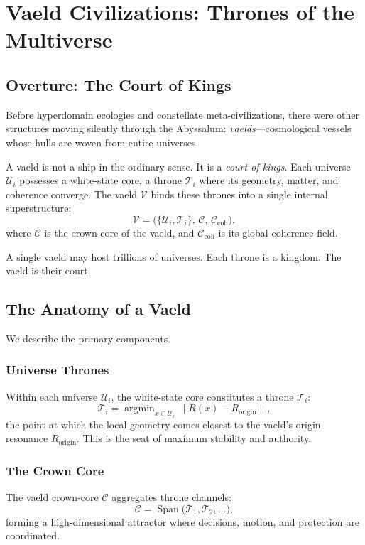 
\chapter{Vaeld Civilizations: Thrones of the Multiverse}
\label{ch:vaeld-civilizations}

\newcommand{\vaeld}{\mathcal{V}}
\newcommand{\throne}{\mathcal{T}}
\newcommand{\universe}{\mathcal{U}}
\newcommand{\core}{\mathcal{C}}
\newcommand{\neural}{\mathcal{N}}
\newcommand{\Co}{\mathcal{C}_{\mathrm{coh}}}
\newcommand{\Adm}{\mathsf{Adm}}

\section*{Overture: The Court of Kings}
Before hyperdomain ecologies and constellate meta-civilizations, there were other structures
moving silently through the Abyssalum: \emph{vaelds}---cosmological vessels whose hulls are woven
from entire universes.

A vaeld is not a ship in the ordinary sense. It is a \emph{court of kings}. Each universe
$\universe_i$ possesses a white-state core, a throne $\throne_i$ where its geometry, matter, and
coherence converge. The vaeld $\vaeld$ binds these thrones into a single internal
superstructure:
\[
\vaeld = \Big( \{\universe_i,\throne_i\},\, \core,\, \Co \Big),
\]
where $\core$ is the crown-core of the vaeld, and $\Co$ is its global coherence field.

A single vaeld may host trillions of universes. Each throne is a kingdom. The vaeld is their
court.

\section{The Anatomy of a Vaeld}
We describe the primary components.

\subsection{Universe Thrones}
Within each universe $\universe_i$, the white-state core constitutes a throne $\throne_i$:
\[
\throne_i = \operatorname{argmin}_{x \in \universe_i} \big\| R(x) - R_{\mathrm{origin}} \big\|,
\]
the point at which the local geometry comes closest to the vaeld's origin resonance
$R_{\mathrm{origin}}$. This is the seat of maximum stability and authority.

\subsection{The Crown Core}
The vaeld crown-core $\core$ aggregates throne channels:
\[
\core = \operatorname{Span}\big(\throne_1,\throne_2,\dots\big),
\]
forming a high-dimensional attractor where decisions, motion, and protection are coordinated.

